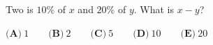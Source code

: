 Two is $10\%$ of $x$ and $20\%$ of $y$. What is $x-y$?

$\textbf{(A)}\ 1\qquad\textbf{(B)}\ 2\qquad\textbf{(C)}\ 5\qquad\textbf{(D)}\ 10\qquad\textbf{(E)}\ 20$

